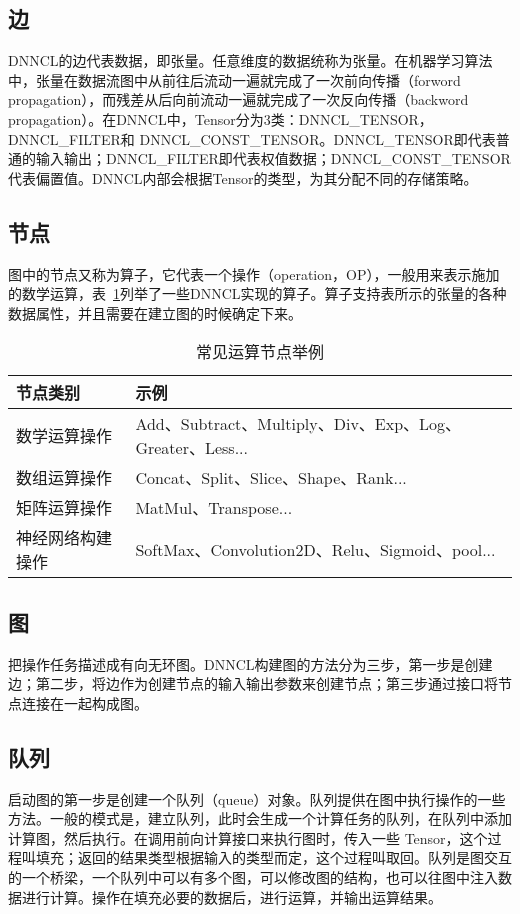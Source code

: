 \subsection {边}
DNNCL的边代表数据，即张量。任意维度的数据统称为张量。在机器学习算法中，张量在数据流图中从前往后流动一遍就完成了一次前向传播（forword propagation），而残差从后向前流动一遍就完成了一次反向传播（backword propagation）。在DNNCL中，Tensor分为3类：DNNCL\_TENSOR，DNNCL\_FILTER和 DNNCL\_CONST\_TENSOR。DNNCL\_TENSOR即代表普通的输入输出；DNNCL\_FILTER即代表权值数据；DNNCL\_CONST\_TENSOR代表偏置值。DNNCL内部会根据Tensor的类型，为其分配不同的存储策略。

\subsection {节点}
图中的节点又称为算子，它代表一个操作（operation，OP），一般用来表示施加的数学运算，表~\ref{tab:compute-node}列举了一些DNNCL实现的算子。算子支持表所示的张量的各种数据属性，并且需要在建立图的时候确定下来。

\begin{table}[htb]
  \centering\small
  \caption{常见运算节点举例}
  \label{tab:compute-node}
  \begin{tabular}{ll}
    \toprule
    节点类别   &  示例                                     \\
    \midrule
    数学运算操作 & Add、Subtract、Multiply、Div、Exp、Log、Greater、Less... \\
    数组运算操作 & Concat、Split、Slice、Shape、Rank... \\
    矩阵运算操作 & MatMul、Transpose...     \\
    神经网络构建操作 & SoftMax、Convolution2D、Relu、Sigmoid、pool... \\
    \bottomrule
  \end{tabular}
\end{table}

\subsection {图}
把操作任务描述成有向无环图。DNNCL构建图的方法分为三步，第一步是创建边；第二步，将边作为创建节点的输入输出参数来创建节点；第三步通过接口将节点连接在一起构成图。

\subsection {队列}
启动图的第一步是创建一个队列（queue）对象。队列提供在图中执行操作的一些方法。一般的模式是，建立队列，此时会生成一个计算任务的队列，在队列中添加计算图，然后执行。在调用前向计算接口来执行图时，传入一些 Tensor，这个过程叫填充；返回的结果类型根据输入的类型而定，这个过程叫取回。队列是图交互的一个桥梁，一个队列中可以有多个图，可以修改图的结构，也可以往图中注入数据进行计算。操作在填充必要的数据后，进行运算，并输出运算结果。

